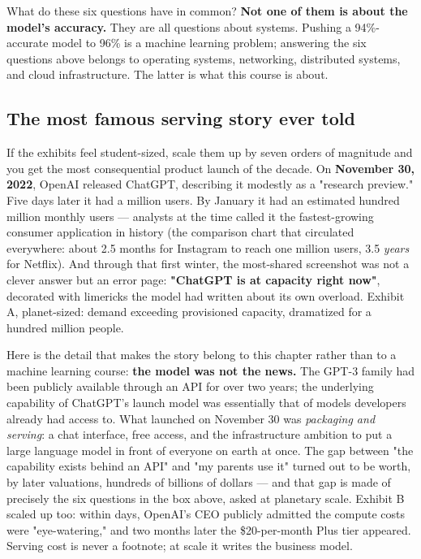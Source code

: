 What do these six questions have in common? \textbf{Not one of them is about the model's accuracy.} They are all questions about systems. Pushing a 94\%-accurate model to 96\% is a machine learning problem; answering the six questions above belongs to operating systems, networking, distributed systems, and cloud infrastructure. The latter is what this course is about.

\subsection*{The most famous serving story ever told}

If the exhibits feel student-sized, scale them up by seven orders of magnitude and you get the most consequential product launch of the decade. On \textbf{November 30, 2022}, OpenAI released ChatGPT, describing it modestly as a "research preview." Five days later it had a million users. By January it had an estimated hundred million monthly users — analysts at the time called it the fastest-growing consumer application in history (the comparison chart that circulated everywhere: about 2.5 months for Instagram to reach one million users, 3.5 \textit{years} for Netflix). And through that first winter, the most-shared screenshot was not a clever answer but an error page: \textbf{"ChatGPT is at capacity right now"}, decorated with limericks the model had written about its own overload. Exhibit A, planet-sized: demand exceeding provisioned capacity, dramatized for a hundred million people.

Here is the detail that makes the story belong to this chapter rather than to a machine learning course: \textbf{the model was not the news.} The GPT-3 family had been publicly available through an API for over two years; the underlying capability of ChatGPT's launch model was essentially that of models developers already had access to. What launched on November 30 was \textit{packaging and serving}: a chat interface, free access, and the infrastructure ambition to put a large language model in front of everyone on earth at once. The gap between "the capability exists behind an API" and "my parents use it" turned out to be worth, by later valuations, hundreds of billions of dollars — and that gap is made of precisely the six questions in the box above, asked at planetary scale. Exhibit B scaled up too: within days, OpenAI's CEO publicly admitted the compute costs were "eye-watering," and two months later the \$20-per-month Plus tier appeared. Serving cost is never a footnote; at scale it writes the business model.

